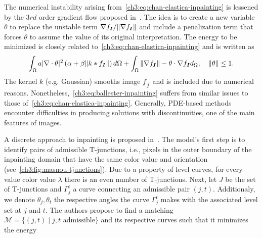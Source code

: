 The numerical instability arising from~\cref{ch3:eq:chan-elastica-inpainting} is lessened by the $3rd$ order gradient flow proposed in~\cite{ballester01filling}. The idea is to create a new variable $\theta$ to replace the unstable term $\nabla f_{\bm{I}} / \lVert\nabla f_{\bm{I}}\rVert$ and include a penalization term that forces $\theta$ to assume the value of its original interpretation. The energy to be minimized is closely related to~\cref{ch3:eq:chan-elastica-inpainting} and is written as
\begin{align}
	\int_{\Omega}{a|\nabla \cdot \theta|^2\left(\alpha + \beta \lVert k * f_{\bm{I}} \rVert\right)d\Omega} + \int_{\Omega}{ \lVert\nabla f_{\bm{I}} \rVert - \theta \cdot \nabla f_{\bm{I}} d_{\Omega}},\quad \lVert\theta\rVert \leq 1.
	\label{ch3:eq:ballester-inpainting}
\end{align}
%
The kernel $k$ (e.g. Gaussian) smooths image $f_{\vec{I}}$ and is included due to numerical reasons. Nonetheless,~\cref{ch3:eq:ballester-inpainting} suffers from similar issues to those of~\cref{ch3:eq:chan-elastica-inpainting}. Generally, PDE-based methods encounter difficulties in producing solutions with discontinuities, one of the main features of images.

A discrete approach to inpainting is proposed in~\cite{masnou98inpainting}. The model's first step is to identify pairs of admissible T-junctions, i.e., pixels in the outer boundary of the inpainting domain that have the same color value and orientation (see~\cref{ch3:fig:masnou-tjunctions}). Due to a property of level curves, for every value color value $\lambda$ there is an even number of T-junctions. Next, let $J$ be the set of T-junctions and $\Gamma_j^t$ a curve connecting an admissible pair $(j,t)$. Additionaly, we denote $\theta_j,\theta_t$ the respective angles the curve $\Gamma_j^t$ makes with the associated level set at $j$ and $t$. The authors propose to find a matching $\mathcal{M}=\{ (j,t) \; | \; j,t\text{ admissible} \}$ and its respective curves such that it minimizes the energy

